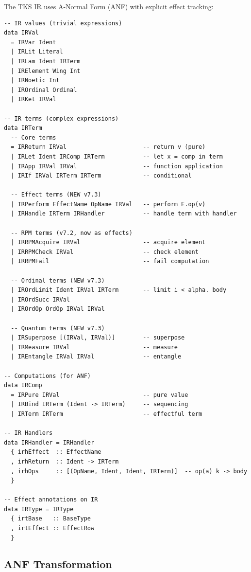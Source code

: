\begin{definition}
\label{def:ir-syntax}
The TKS IR uses A-Normal Form (ANF) with explicit effect tracking:
\begin{verbatim}
-- IR values (trivial expressions)
data IRVal
  = IRVar Ident
  | IRLit Literal
  | IRLam Ident IRTerm
  | IRElement Wing Int
  | IRNoetic Int
  | IROrdinal Ordinal
  | IRKet IRVal

-- IR terms (complex expressions)
data IRTerm
  -- Core terms
  = IRReturn IRVal                      -- return v (pure)
  | IRLet Ident IRComp IRTerm           -- let x = comp in term
  | IRApp IRVal IRVal                   -- function application
  | IRIf IRVal IRTerm IRTerm            -- conditional

  -- Effect terms (NEW v7.3)
  | IRPerform EffectName OpName IRVal   -- perform E.op(v)
  | IRHandle IRTerm IRHandler           -- handle term with handler

  -- RPM terms (v7.2, now as effects)
  | IRRPMAcquire IRVal                  -- acquire element
  | IRRPMCheck IRVal                    -- check element
  | IRRPMFail                           -- fail computation

  -- Ordinal terms (NEW v7.3)
  | IROrdLimit Ident IRVal IRTerm       -- limit i < alpha. body
  | IROrdSucc IRVal
  | IROrdOp OrdOp IRVal IRVal

  -- Quantum terms (NEW v7.3)
  | IRSuperpose [(IRVal, IRVal)]        -- superpose
  | IRMeasure IRVal                     -- measure
  | IREntangle IRVal IRVal              -- entangle

-- Computations (for ANF)
data IRComp
  = IRPure IRVal                        -- pure value
  | IRBind IRTerm (Ident -> IRTerm)     -- sequencing
  | IRTerm IRTerm                       -- effectful term

-- IR Handlers
data IRHandler = IRHandler
  { irhEffect  :: EffectName
  , irhReturn  :: Ident -> IRTerm
  , irhOps     :: [(OpName, Ident, Ident, IRTerm)]  -- op(a) k -> body
  }

-- Effect annotations on IR
data IRType = IRType
  { irtBase   :: BaseType
  , irtEffect :: EffectRow
  }
\end{verbatim}
\end{definition}

\subsection{ANF Transformation}
\label{subsec:anf-transform}

